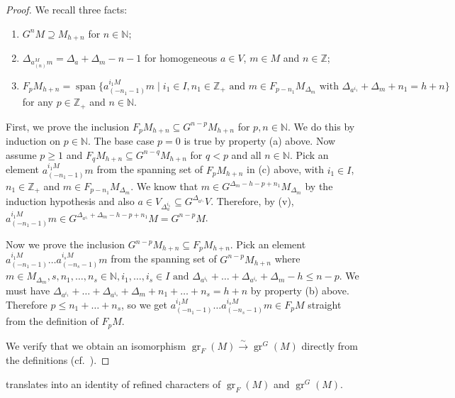 \documentclass[a4paper, 12pt, reqno]{amsart}
\theoremstyle{remark}
\numberwithin{equation}{subsection}
\DeclareMathOperator{\gr}{gr}
\DeclareMathOperator{\vspan}{span}
\begin{document}
\begin{proof}
  We recall three facts:
  \begin{enumerate}[label = (\alph*)]
  \item $G^nM \supseteq M_{h + n}$ for $n \in \mathbb{N}$;
  \item $\Delta_{a^M_{(n)}m} = \Delta_a + \Delta_m - n - 1$ for homogeneous $a \in V$, $m \in M$ and $n \in \mathbb{Z}$;
  \item $F_pM_{h + n} = \vspan\{a^{i_1M}_{(-n_1 - 1)}m \mid i_1 \in I, n_1 \in \mathbb{Z}_+\text{ and }m \in F_{p - n_1}M_{\Delta_m}\text{ with }\Delta_{a^{i_1}} + \Delta_m + n_1 = h + n\}$ for any $p \in \mathbb{Z}_+$ and $n \in \mathbb{N}$.
  \end{enumerate}
  First, we prove the inclusion $F_pM_{h + n} \subseteq G^{n - p}M_{h + n}$ for $p, n \in \mathbb{N}$.
  We do this by induction on $p \in \mathbb{N}$.
  The base case $p = 0$ is true by property (a) above.
  Now assume $p \ge 1$ and $F_qM_{h + n} \subseteq G^{n - q}M_{h + n}$ for $q < p$ and all $n \in \mathbb{N}$.
  Pick an element $a^{i_1M}_{(-n_1 - 1)}m$ from the spanning set of $F_pM_{h + n}$ in (c) above, with $i_1 \in I$, $n_1 \in \mathbb{Z}_+$ and $m \in F_{p - n_1}M_{\Delta_m}$.
  We know that $m \in G^{\Delta_m - h - p + n_1}M_{\Delta_m}$ by the induction hypothesis and also $a \in V_{\Delta_a^{i_1}} \subseteq G^{\Delta_{a^{i_1}}}V$.
  Therefore, by (v), $a^{i_1M}_{(-n_1 - 1)}m \in G^{\Delta_{a^{i_1}} + \Delta_m - h - p + n_1}M = G^{n - p}M$.

  Now we prove the inclusion $G^{n - p}M_{h + n} \subseteq F_pM_{h + n}$.
  Pick an element $a^{i_1M}_{(-n_1 - 1)}\dots a^{i_sM}_{(-n_s - 1)}m$ from the spanning set of $G^{n - p}M_{h + n}$ where $m \in M_{\Delta_m}, s, n_1, \dots, n_s \in \mathbb{N}, i_1, \dots, i_s \in I\text{ and }\Delta_{a^{i_1}} + \dots + \Delta_{a^{i_s}} + \Delta_m - h \le n - p$.
  We must have $\Delta_{a^{i_1}} + \dots + \Delta_{a^{i_s}} + \Delta_m + n_1 + \dots + n_s = h + n$ by property (b) above.
  Therefore $p \le n_1 + \dots + n_s$, so we get $a^{i_1M}_{(-n_1 - 1)}\dots a^{i_sM}_{(-n_s - 1)}m \in F_pM$ straight from the definition of $F_pM$.

  We verify that we obtain an isomorphism $\gr_F(M) \xrightarrow{\sim} \gr^G(M)$ directly from the definitions (cf.\ ).
\end{proof}

 translates into an identity of refined characters of $\gr_F(M)$ and $\gr^G(M)$.
\end{document}
